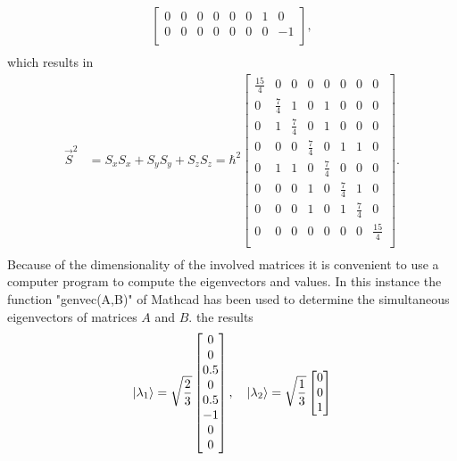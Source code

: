 \begin{example}
\begin{equation}
\begin{split}
\begin{bmatrix}
				0 & 0 & 0 & 0 & 0 & 0 & 1 & 0 \\
				0 & 0 & 0 & 0 & 0 & 0 & 0 & -1 \\
			\end{bmatrix}, \\
		\end{split}
	\end{equation} 
	which results in
	\begin{equation}
		\begin{split}
			\vec{S}^2&=S_xS_x+S_yS_y+S_zS_z=\hbar^2\begin{bmatrix}
				\frac{15}{4} & 0 & 0 & 0 & 0 & 0 & 0 & 0 \\
				0 & \frac{7}{4} & 1 & 0 & 1 & 0 & 0 & 0 \\
				0 & 1 & \frac{7}{4} & 0 & 1 & 0 & 0 & 0 \\
				0 & 0 & 0 & \frac{7}{4} & 0 & 1 & 1 & 0 \\
				0 & 1 & 1 & 0 & \frac{7}{4} & 0 & 0 & 0 \\
				0 & 0 & 0 & 1 & 0 & \frac{7}{4} & 1 & 0 \\
				0 & 0 & 0 & 1 & 0 & 1 & \frac{7}{4} & 0 \\
				0 & 0 & 0 & 0 & 0 & 0 & 0 & \frac{15}{4} \\
			\end{bmatrix}. \\
		\end{split}
	\end{equation} 
	Because of the dimensionality of the involved matrices it is convenient to use a computer program to compute the eigenvectors and values. In this instance the function "genvec(A,B)" of Mathcad has been used to determine the simultaneous eigenvectors of matrices $A$ and $B$. the results
	\begin{equation}
		\ket{\lambda_1}=\sqrt{\frac{2}{3}}
		\begin{bmatrix}
			0 \\
			0 \\
			0.5 \\
			0 \\
			0.5 \\
			-1 \\
			0 \\
			0 \\
		\end{bmatrix}, \quad \ket{\lambda_2}=\sqrt{\frac{1}{3}}
		\begin{bmatrix}
			0 \\
			0 \\
			1 \\

\end{bmatrix}
\end{equation}
\end{example}
